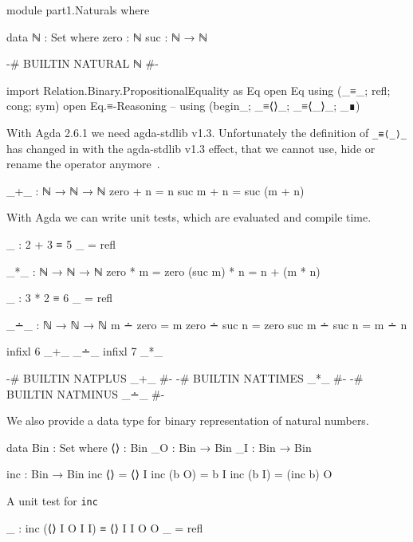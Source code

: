 \begin{code}
module part1.Naturals where

data ℕ : Set where
  zero : ℕ
  suc  : ℕ → ℕ
\end{code}

\begin{code}
{-# BUILTIN NATURAL ℕ #-}
\end{code}

\begin{code}
import Relation.Binary.PropositionalEquality as Eq
open Eq using (_≡_; refl; cong; sym)
open Eq.≡-Reasoning -- using (begin_; _≡⟨⟩_; _≡⟨_⟩_; _∎)
\end{code}
With Agda 2.6.1 we need agda-stdlib v1.3. Unfortunately the definition of \verb+_≡⟨_⟩_+
has changed in with the agda-stdlib v1.3 effect, that we cannot use, hide or rename the operator
anymore~\cite{agda-stdlib-1.3-changelog-reasoning}.

\begin{code}
_+_ : ℕ → ℕ → ℕ
zero  + n = n
suc m + n = suc (m + n)
\end{code}

With Agda we can write unit tests, which are evaluated and compile time.
\begin{code}
_ : 2 + 3 ≡ 5
_ = refl
\end{code}

\begin{code}
_*_ : ℕ → ℕ → ℕ
zero    * m = zero
(suc m) * n = n + (m * n)

_ : 3 * 2 ≡ 6
_ = refl
\end{code}

\begin{code}
_∸_ : ℕ → ℕ → ℕ
m     ∸ zero   =  m
zero  ∸ suc n  =  zero
suc m ∸ suc n  =  m ∸ n

infixl 6  _+_  _∸_
infixl 7  _*_

{-# BUILTIN NATPLUS _+_ #-}
{-# BUILTIN NATTIMES _*_ #-}
{-# BUILTIN NATMINUS _∸_ #-}
\end{code}

We also provide a data type for binary representation of natural numbers.
\begin{code}
data Bin : Set where
  ⟨⟩ : Bin
  _O : Bin → Bin
  _I : Bin → Bin

inc : Bin → Bin
inc ⟨⟩ = ⟨⟩ I
inc (b O) = b I
inc (b I) = (inc b) O
\end{code}

A unit test for \verb+inc+
\begin{code}
_ : inc (⟨⟩ I O I I) ≡ ⟨⟩ I I O O
_ = refl
\end{code}

